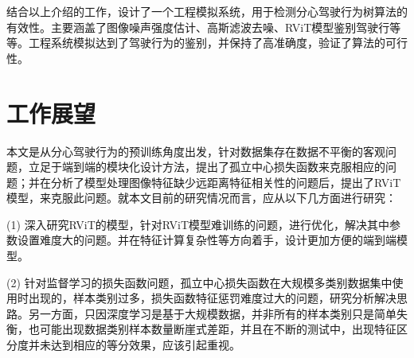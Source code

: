 结合以上介绍的工作，设计了一个工程模拟系统，用于检测分心驾驶行为树算法的有效性。主要涵盖了图像噪声强度估计、高斯滤波去噪、RViT模型鉴别驾驶行等等。工程系统模拟达到了驾驶行为的鉴别，并保持了高准确度，验证了算法的可行性。


\section{工作展望}

本文是从分心驾驶行为的预训练角度出发，针对数据集存在数据不平衡的客观问题，立足于端到端的模块化设计方法，提出了孤立中心损失函数来克服相应的问题；并在分析了模型处理图像特征缺少远距离特征相关性的问题后，提出了RViT模型，来克服此问题。就本文目前的研究情况而言，应从以下几方面进行研究：

(1)	深入研究RViT的模型，针对RViT模型难训练的问题，进行优化，解决其中参数设置难度大的问题。并在特征计算复杂性等方向着手，设计更加方便的端到端模型。

(2)	针对监督学习的损失函数问题，孤立中心损失函数在大规模多类别数据集中使用时出现的，样本类别过多，损失函数特征惩罚难度过大的问题，研究分析解决思路。另一方面，只因深度学习是基于大规模数据，并非所有的样本类别只是简单失衡，也可能出现数据类别样本数量断崖式差距，并且在不断的测试中，出现特征区分度并未达到相应的等分效果，应该引起重视。
